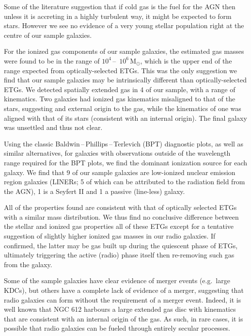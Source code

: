 \begin{abstractlong}
Some of the literature suggestion that if cold gas is the fuel for the AGN then unless it is accreting in a highly turbulent way, it might be expected to form stars. However we see no evidence of a very young stellar population right at the centre of our sample galaxies. 

For the ionized gas components of our sample galaxies, the estimated gas masses were found to be in the range of $10^4$\,--\, $10^6\,\mathrm{M_\odot}$, which is the upper end of the range expected from optically-selected ETGs. This was the only suggestion we find that our sample galaxies may be intrinsically different than optically-selected ETGs. We detected spatially extended gas in 4 of our sample, with a range of kinematics. Two galaxies had ionized gas kinematics misaligned to that of the stars, suggesting and external origin to the gas, while the kinematics of one was aligned with that of its stars (consistent with an internal origin). The final galaxy was unsettled and thus not clear. 

Using the classic Baldwin\,--\,Phillips\,--\,Terlevich (BPT) diagnostic plots, as well as similar alternatives, for galaxies with observations outside of the wavelength range required for the BPT plots, we find the dominant ionization source for each galaxy. We find that 9 of our sample galaxies are low-ionized nuclear emission region galaxies (LINERs; 5 of which can be attributed to the radiation field from the AGN), 1 is a Seyfert II and 1 a passive (line-less) galaxy. 

All of the properties found are consistent with that of optically selected ETGs with a similar mass distribution. We thus find no conclusive difference between the stellar and ionized gas properties all of these ETGs except for a tentative suggestion of slightly higher ionized gas masses in our radio galaxies. If confirmed, the latter may be gas built up during the quiescent phase of ETGs, ultimately triggering the active (radio) phase itself then re-removing such gas from the galaxy.

Some of the sample galaxies have clear evidence of merger events (e.g.\ large KDCs), but others have a complete lack of evidence of a merger, suggesting that radio galaxies can form without the requirement of a merger event. Indeed, it is well known that NGC 612 harbours a large extended gas disc with kinematics that are consistent with an internal origin of the gas. As such, in rare cases, it is possible that radio galaxies can be fueled through entirely secular processes.
\end{abstractlong}